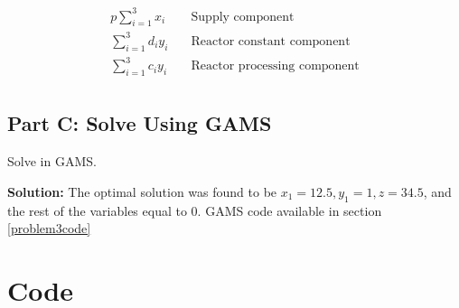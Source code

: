 \documentclass[11pt]{article}
\begin{document}
\begin{align*}
  p\sum_{i=1}^{3}x_i  & \quad \text{Supply component} \\
  \sum_{i=1}^{3}d_i y_i & \quad \text{Reactor constant component} \\
  \sum_{i=1}^{3}c_i y_i & \quad \text{Reactor processing component} \\
\end{align*}
\subsection{Part C: Solve Using GAMS}
Solve in GAMS.

\textbf{Solution:}
The optimal solution was found to be $x_1=12.5, y_1=1, z=34.5$, and the rest of the variables equal to 0.
GAMS code available in section \ref{problem3code}


\clearpage
\section{Code}
\end{document}
